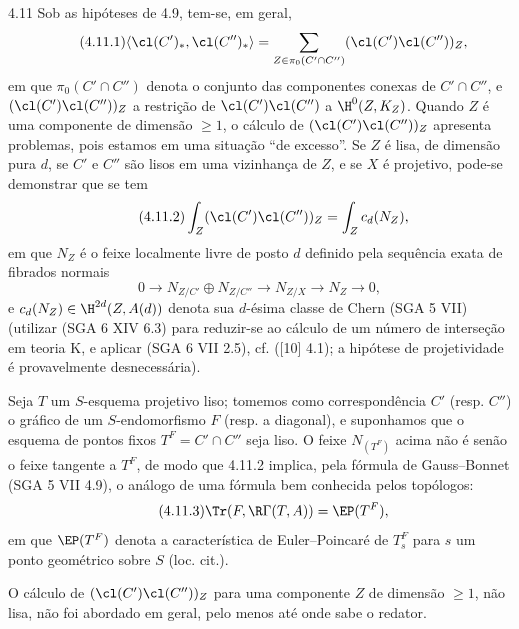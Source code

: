 \begin{statement}{4.11}
Sob as hipóteses de 4.9, tem-se, em geral,
\begin{equation}
\tag{4.11.1}
\langle \cl(C')_*,\cl(C'')_*\rangle
=
\sum_{Z\in\pi_0(C'\cap C'')}(\cl(C')\cl(C''))_Z,
\end{equation}
em que $\pi_0(C'\cap C'')$ denota o conjunto das componentes conexas de $C'\cap C''$, e $(\cl(C')\cl(C''))_Z$ a restrição de $\cl(C')\cl(C'')$ a $\H^0(Z,K_Z)$. Quando $Z$ é uma componente de dimensão $\geq 1$, o cálculo de $(\cl(C')\cl(C''))_Z$ apresenta problemas, pois estamos em uma situação ``de excesso''. Se $Z$ é lisa, de dimensão pura $d$, se $C'$ e $C''$ são lisos em uma vizinhança de $Z$, e se $X$ é projetivo, pode-se demonstrar que se tem
\begin{equation}
\tag{4.11.2}
\int_Z(\cl(C')\cl(C''))_Z=\int_Z c_d(N_Z),
\end{equation}
em que $N_Z$ é o feixe localmente livre de posto $d$ definido pela sequência exata de fibrados normais
\[
0\longrightarrow N_{Z/C'}\oplus N_{Z/C''}\longrightarrow N_{Z/X}\longrightarrow N_Z\longrightarrow 0,
\]
e $c_d(N_Z)\in \H^{2d}(Z,A(d))$ denota sua $d$-ésima classe de Chern (SGA 5 VII) (utilizar (SGA 6 XIV 6.3) para reduzir-se ao cálculo de um número de interseção em teoria K, e aplicar (SGA 6 VII 2.5), cf. ([10] 4.1); a hipótese de projetividade é provavelmente desnecessária).

Seja $T$ um $S$-esquema projetivo liso; tomemos como correspondência $C'$ (resp. $C''$) o gráfico de um $S$-endomorfismo $F$ (resp. a diagonal), e suponhamos que o esquema de pontos fixos $T^F=C'\cap C''$ seja liso. O feixe $N_{(T^F)}$ acima não é senão o feixe tangente a $T^F$, de modo que 4.11.2 implica, pela fórmula de Gauss--Bonnet (SGA 5 VII 4.9), o análogo de uma fórmula bem conhecida pelos topólogos:
\begin{equation}
\tag{4.11.3}
\Tr(F,\R\Gamma(T,A))=\EP(T^F),
\end{equation}
em que $\EP(T^F)$ denota a característica de Euler--Poincaré de $T_s^F$ para $s$ um ponto geométrico sobre $S$ (loc. cit.).
\end{statement}

O cálculo de $(\cl(C')\cl(C''))_Z$ para uma componente $Z$ de dimensão $\geq 1$, não lisa, não foi abordado em geral, pelo menos até onde sabe o redator.

